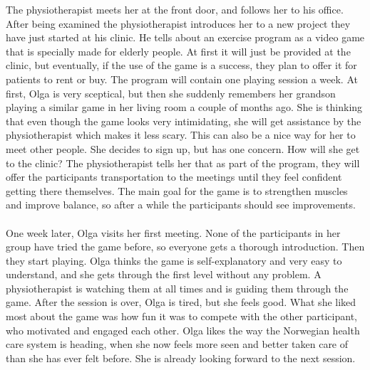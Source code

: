The physiotherapist meets her at the front door, and follows her to his office. After being examined the physiotherapist introduces her to a new project they have just started at his clinic. He tells about an exercise program as a video game that is specially made for elderly people. At first it will just be provided at the clinic, but eventually, if the use of the game is a success, they plan to offer it for patients to rent or buy. The program will contain one playing session a week. At first, Olga is very sceptical, but then she suddenly remembers her grandson playing a similar game in her living room a couple of months ago. She is thinking that even though the game looks very intimidating, she will get assistance by the physiotherapist which makes it less scary. This can also be a nice way for her to meet other people. She decides to sign up, but has one concern. How will she get to the clinic? The physiotherapist tells her that as part of the program, they will offer the participants transportation to the meetings until they feel confident getting there themselves. The main goal for the game is to strengthen muscles and improve balance, so after a while the participants should see improvements. \\ \\
One week later, Olga visits her first meeting. None of the participants in her group have tried the game before, so everyone gets a thorough introduction. Then they start playing. Olga thinks the game is self-explanatory and very easy to understand, and she gets through the first level without any problem. A physiotherapist is watching them at all times and is guiding them through the game. After the session is over, Olga is tired, but she feels good. What she liked most about the game was how fun it was to compete with the other participant, who motivated and engaged each other. Olga likes the way the Norwegian health care system is heading, when she now feels more seen and better taken care of than she has ever felt before. She is already looking forward to the next session.

